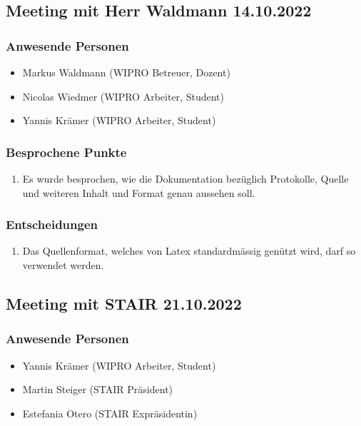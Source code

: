 \documentclass[a4paper, table]{article}
\begin{document}
\newpage
\subsection{Meeting mit Herr Waldmann 14.10.2022}

\subsubsection*{Anwesende Personen}

\begin{itemize}
    \item Markus Waldmann (WIPRO Betreuer, Dozent)
    \item Nicolas Wiedmer (WIPRO Arbeiter, Student)
    \item Yannis Krämer (WIPRO Arbeiter, Student)
\end{itemize}

\subsubsection*{Besprochene Punkte}

\begin{enumerate}
    \item Es wurde besprochen, wie die Dokumentation bezüglich Protokolle, Quelle und weiteren Inhalt und Format genau aussehen soll.
\end{enumerate}

\subsubsection*{Entscheidungen}

\begin{enumerate}
    \item Das Quellenformat, welches von Latex standardmässig genützt wird, darf so verwendet werden.
\end{enumerate}

\newpage
\subsection{Meeting mit STAIR 21.10.2022}

\subsubsection*{Anwesende Personen}

\begin{itemize}
    \item Yannis Krämer (WIPRO Arbeiter, Student)
    \item Martin Steiger (STAIR Präsident)
    \item Estefania Otero (STAIR Expräsidentin)
\end{itemize}
\end{document}
